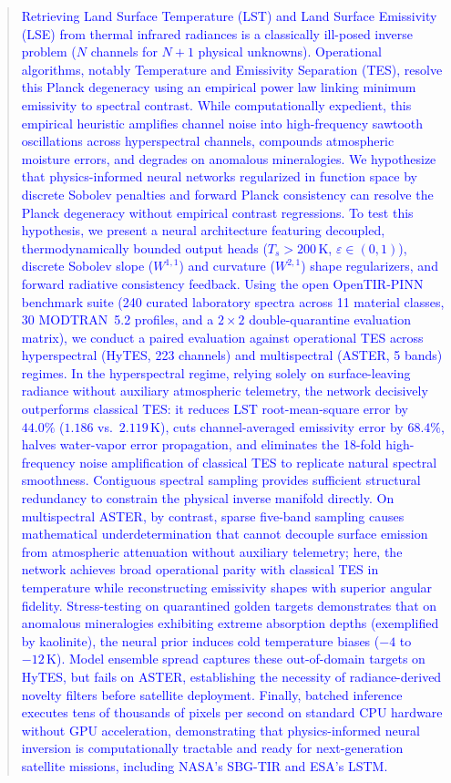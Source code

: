 \documentclass[preprint,review,12pt,authoryear]{elsarticle}
\begin{document}
\begin{frontmatter}
\begin{abstract}
\textcolor{blue}{Retrieving Land Surface Temperature (LST) and Land Surface Emissivity (LSE) from thermal infrared radiances is a classically ill-posed inverse problem ($N$ channels for $N + 1$ physical unknowns). Operational algorithms, notably Temperature and Emissivity Separation (TES), resolve this Planck degeneracy using an empirical power law linking minimum emissivity to spectral contrast. While computationally expedient, this empirical heuristic amplifies channel noise into high-frequency sawtooth oscillations across hyperspectral channels, compounds atmospheric moisture errors, and degrades on anomalous mineralogies. We hypothesize that physics-informed neural networks regularized in function space by discrete Sobolev penalties and forward Planck consistency can resolve the Planck degeneracy without empirical contrast regressions. To test this hypothesis, we present a neural architecture featuring decoupled, thermodynamically bounded output heads ($T_s > 200\,\mathrm{K}$, $\varepsilon \in (0, 1)$), discrete Sobolev slope ($W^{1,1}$) and curvature ($W^{2,1}$) shape regularizers, and forward radiative consistency feedback. Using the open OpenTIR-PINN benchmark suite (240 curated laboratory spectra across 11 material classes, 30 MODTRAN~5.2 profiles, and a $2 \times 2$ double-quarantine evaluation matrix), we conduct a paired evaluation against operational TES across hyperspectral (HyTES, 223 channels) and multispectral (ASTER, 5 bands) regimes. In the hyperspectral regime, relying solely on surface-leaving radiance without auxiliary atmospheric telemetry, the network decisively outperforms classical TES: it reduces LST root-mean-square error by $44.0\%$ ($1.186$ vs.\ $2.119\,\mathrm{K}$), cuts channel-averaged emissivity error by $68.4\%$, halves water-vapor error propagation, and eliminates the 18-fold high-frequency noise amplification of classical TES to replicate natural spectral smoothness. Contiguous spectral sampling provides sufficient structural redundancy to constrain the physical inverse manifold directly. On multispectral ASTER, by contrast, sparse five-band sampling causes mathematical underdetermination that cannot decouple surface emission from atmospheric attenuation without auxiliary telemetry; here, the network achieves broad operational parity with classical TES in temperature while reconstructing emissivity shapes with superior angular fidelity. Stress-testing on quarantined golden targets demonstrates that on anomalous mineralogies exhibiting extreme absorption depths (exemplified by kaolinite), the neural prior induces cold temperature biases ($-4$ to $-12\,\mathrm{K}$). Model ensemble spread captures these out-of-domain targets on HyTES, but fails on ASTER, establishing the necessity of radiance-derived novelty filters before satellite deployment. Finally, batched inference executes tens of thousands of pixels per second on standard CPU hardware without GPU acceleration, demonstrating that physics-informed neural inversion is computationally tractable and ready for next-generation satellite missions, including NASA's SBG-TIR and ESA's LSTM.}
\end{abstract}


\end{frontmatter}
\end{document}
